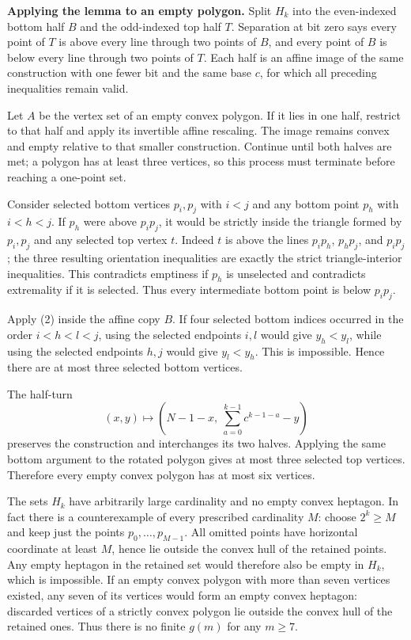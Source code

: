 \textbf{Applying the lemma to an empty polygon.} Split $H_k$ into the even-indexed bottom half $B$ and the odd-indexed top half $T$. Separation at bit zero says every point of $T$ is above every line through two points of $B$, and every point of $B$ is below every line through two points of $T$. Each half is an affine image of the same construction with one fewer bit and the same base $c$, for which all preceding inequalities remain valid.

Let $A$ be the vertex set of an empty convex polygon. If it lies in one half, restrict to that half and apply its invertible affine rescaling. The image remains convex and empty relative to that smaller construction. Continue until both halves are met; a polygon has at least three vertices, so this process must terminate before reaching a one-point set.

Consider selected bottom vertices $p_i,p_j$ with $i<j$ and any bottom point $p_h$ with $i<h<j$. If $p_h$ were above $p_ip_j$, it would be strictly inside the triangle formed by $p_i,p_j$ and any selected top vertex $t$. Indeed $t$ is above the lines $p_ip_h$, $p_hp_j$, and $p_ip_j$; the three resulting orientation inequalities are exactly the strict triangle-interior inequalities. This contradicts emptiness if $p_h$ is unselected and contradicts extremality if it is selected. Thus every intermediate bottom point is below $p_ip_j$.

Apply (2) inside the affine copy $B$. If four selected bottom indices occurred in the order $i<h<l<j$, using the selected endpoints $i,l$ would give $y_h<y_l$, while using the selected endpoints $h,j$ would give $y_l<y_h$. This is impossible. Hence there are at most three selected bottom vertices.

The half-turn
\[
(x,y)\longmapsto\left(N-1-x,\ \sum_{a=0}^{k-1}c^{k-1-a}-y\right)
\]
preserves the construction and interchanges its two halves. Applying the same bottom argument to the rotated polygon gives at most three selected top vertices. Therefore every empty convex polygon has at most six vertices.

The sets $H_k$ have arbitrarily large cardinality and no empty convex heptagon. In fact there is a counterexample of every prescribed cardinality $M$: choose $2^k\geq M$ and keep just the points $p_0,\ldots,p_{M-1}$. All omitted points have horizontal coordinate at least $M$, hence lie outside the convex hull of the retained points. Any empty heptagon in the retained set would therefore also be empty in $H_k$, which is impossible. If an empty convex polygon with more than seven vertices existed, any seven of its vertices would form an empty convex heptagon: discarded vertices of a strictly convex polygon lie outside the convex hull of the retained ones. Thus there is no finite $g(m)$ for any $m\geq7$.

